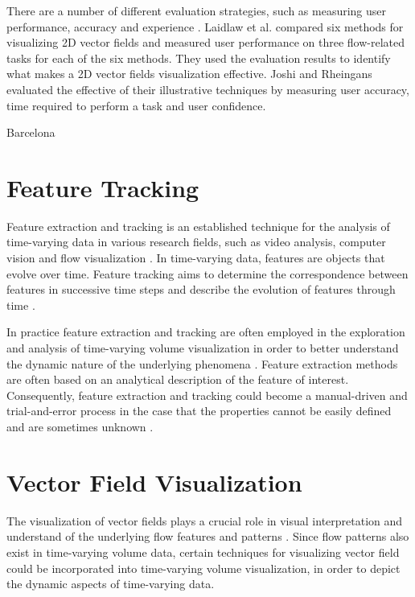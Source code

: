 There are a number of different evaluation strategies, such as measuring user performance, accuracy and experience \cite{redmond_influencing_2010}. Laidlaw et al. \cite{laidlaw_quantitative_2001} compared six methods for visualizing 2D vector fields and measured user performance on three flow-related tasks for each of the six methods. They used the evaluation results to identify what makes a 2D vector fields visualization effective.
Joshi and Rheingans \cite{joshi_evaluation_2008} evaluated the effective of their illustrative techniques by measuring user accuracy, time required to perform a task and user confidence.

\cite{carmi_causal_2006}

\cite{lu_volume_2010}
\cite{kersten-oertel_evaluation_2014}

Barcelona
\cite{diaz_perceptual_2015}
\cite{diaz_iriberri_enhanced_2013}

\section{Feature Tracking}
Feature extraction and tracking is an established technique for the analysis of time-varying data in various research fields, such as video analysis, computer vision and flow visualization \cite{muelder_interactive_2009}.
In time-varying data, features are objects that evolve over time. Feature tracking aims to determine the correspondence between features in successive time steps and describe the evolution of features through time \cite{post_state_2003}.

In practice feature extraction and tracking are often employed in the exploration and analysis of time-varying volume visualization in order to better understand the dynamic nature of the underlying phenomena \cite{tzeng_intelligent_2005} \cite{woodring_multiscale_2009} \cite{lee_visualizing_2009} \cite{gu_transgraph_2011}.
Feature extraction methods are often based on an analytical description of the feature of interest. Consequently, feature extraction and tracking could become a manual-driven and trial-and-error process in the case that the properties cannot be easily defined and are sometimes unknown \cite{ma_machine_2007}.

\cite{ma_machine_2007} \cite{wang_information_2008}
%
\cite{caban_texture-based_2007}
%
\cite{widanagamaachchi_interactive_2012} \cite{ozer_group_2012}
\cite{hsieh_feature_2013}

\section{Vector Field Visualization}
The visualization of vector fields plays a crucial role in visual interpretation and understand of the underlying flow features and patterns \cite{kuhn_clustering-based_2011} \cite{ma_coherent_2013}. Since flow patterns also exist in time-varying volume data, certain techniques for visualizing vector field could be incorporated into time-varying volume visualization, in order to depict the dynamic aspects of time-varying data.

